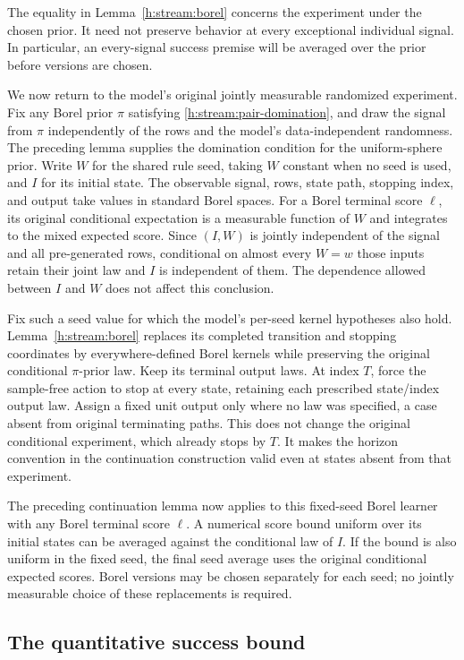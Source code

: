 The equality in Lemma~\ref{h:stream:borel} concerns the experiment under
the chosen prior. It need not preserve behavior at every exceptional
individual signal. In particular, an every-signal success premise will
be averaged over the prior before versions are chosen.

We now return to the model's original jointly measurable randomized
experiment. Fix any Borel prior $\pi$ satisfying
\eqref{h:stream:pair-domination}, and draw the signal from $\pi$
independently of the rows and the model's data-independent randomness.
The preceding lemma supplies the domination condition for the
uniform-sphere prior. Write $W$ for the shared rule seed, taking $W$ constant
when no seed is used, and $I$ for its initial state. The observable
signal, rows, state path, stopping index, and output take values in
standard Borel spaces. For a Borel terminal score $\ell$, its original
conditional expectation is a measurable function of $W$ and integrates
to the mixed expected score. Since $(I,W)$ is jointly independent of the signal and all
pre-generated rows, conditional on almost every $W=w$ those inputs
retain their joint law and $I$ is independent of them. The dependence
allowed between $I$ and $W$ does not affect this conclusion.

Fix such a seed value for which the model's per-seed kernel hypotheses
also hold. Lemma~\ref{h:stream:borel}
replaces its completed transition and stopping coordinates by
everywhere-defined Borel kernels while preserving the original
conditional $\pi$-prior law. Keep its terminal output laws. At index $T$,
force the sample-free action to stop at every state, retaining each
prescribed state/index output law. Assign a fixed unit output only where
no law was specified, a case absent from original terminating paths.
This does not change the original conditional
experiment, which already stops by $T$. It makes the horizon convention
in the continuation construction valid even at states absent from that
experiment.

The preceding continuation lemma now applies to this fixed-seed Borel
learner with any Borel terminal score $\ell$. A numerical score bound
uniform over its initial states can be averaged against the conditional
law of $I$. If the bound is also uniform in the fixed seed, the final
seed average uses the original conditional expected scores. Borel
versions may be chosen separately for each seed; no jointly measurable
choice of these replacements is required.

\subsection{The quantitative success bound}

